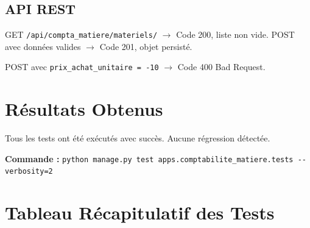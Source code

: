 \documentclass[12pt,a4paper]{report}
\begin{document}
\section{API REST}
\begin{tcolorbox}[title=Cas nominal]
GET \texttt{/api/compta\_matiere/materiels/} $\rightarrow$ Code 200, liste non vide.
POST avec données valides $\rightarrow$ Code 201, objet persisté.
\end{tcolorbox}
\begin{tcolorbox}[title=Cas d'erreur]
POST avec \texttt{prix\_achat\_unitaire = -10} $\rightarrow$ Code 400 Bad Request.
\end{tcolorbox}

\chapter{Résultats Obtenus}

Tous les tests ont été exécutés avec succès. Aucune régression détectée.

\begin{center}
\textbf{Commande :} \texttt{python manage.py test apps.comptabilite\_matiere.tests -{}-verbosity=2}
\end{center}

\chapter{Tableau Récapitulatif des Tests}
\end{document}
